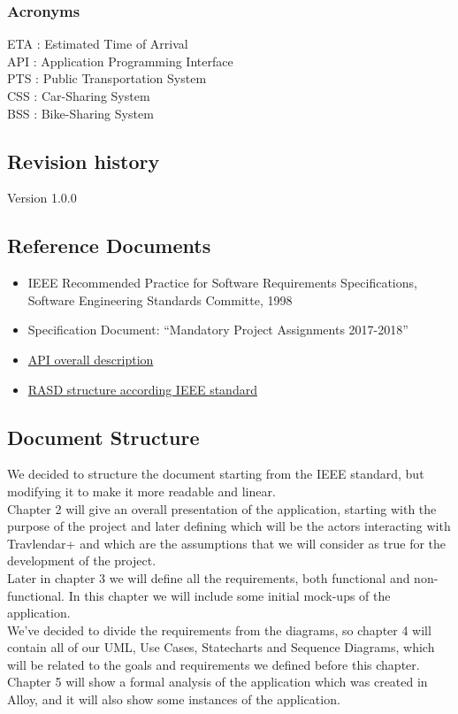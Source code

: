 \documentclass{article}
\begin{document}
\subsubsection{Acronyms}
ETA : Estimated Time of Arrival\\ API : Application Programming Interface\\ PTS : Public Transportation System\\ CSS : Car-Sharing System\\ BSS : Bike-Sharing System
\subsection{Revision history}
Version 1.0.0
\subsection{Reference Documents}
\begin{itemize}
\item{} IEEE Recommended Practice for Software Requirements Specifications, Software Engineering Standards Committe, 1998
\item{} Specification Document: “Mandatory Project Assignments 2017-2018”
\item{} \href{https://www.programmableweb.com/api-university/what-are-apis-and-how-do-they-work}{API overall description}
\item{} \href{http://ieeexplore.ieee.org/stamp/stamp.jsp?arnumber=392555}{RASD structure according IEEE standard}
\end{itemize}
\subsection{Document Structure}
We decided to structure the document starting from the IEEE standard, but modifying it to make it more readable and linear.\\ Chapter 2 will give an overall presentation of the application, starting with the purpose of the project and later defining which will be the actors interacting with Travlendar+ and which are the assumptions that we will consider as true for the development of the project.\\ Later in chapter 3 we will define all the requirements, both functional and non-functional. In this chapter we will include some initial mock-ups of the application.\\We've decided to divide the requirements from the diagrams, so chapter 4 will contain all of our UML, Use Cases, Statecharts and Sequence Diagrams, which will be related to the goals and requirements we defined before this chapter.\\ Chapter 5 will show a formal analysis of the application which was created in Alloy, and it will also show some instances of the application.
\newpage
\end{document}
